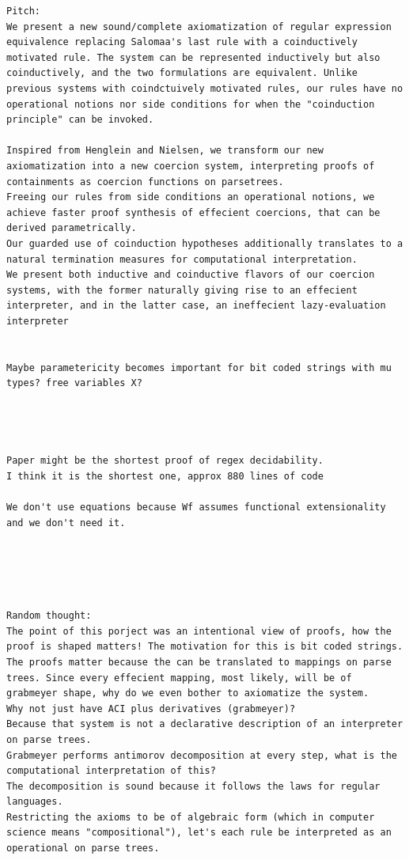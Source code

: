 \begin{verbatim}
Pitch:
We present a new sound/complete axiomatization of regular expression equivalence replacing Salomaa's last rule with a coinductively motivated rule. The system can be represented inductively but also coinductively, and the two formulations are equivalent. Unlike previous systems with coindctuively motivated rules, our rules have no operational notions nor side conditions for when the "coinduction principle" can be invoked.

Inspired from Henglein and Nielsen, we transform our new axiomatization into a new coercion system, interpreting proofs of containments as coercion functions on parsetrees. 
Freeing our rules from side conditions an operational notions, we achieve faster proof synthesis of effecient coercions, that can be derived parametrically.
Our guarded use of coinduction hypotheses additionally translates to a natural termination measures for computational interpretation.
We present both inductive and coinductive flavors of our coercion systems, with the former naturally giving rise to an effecient interpreter, and in the latter case, an ineffecient lazy-evaluation interpreter


Maybe parametericity becomes important for bit coded strings with mu types? free variables X?




Paper might be the shortest proof of regex decidability.
I think it is the shortest one, approx 880 lines of code

We don't use equations because Wf assumes functional extensionality and we don't need it.





Random thought:
The point of this porject was an intentional view of proofs, how the proof is shaped matters! The motivation for this is bit coded strings.
The proofs matter because the can be translated to mappings on parse trees. Since every effecient mapping, most likely, will be of grabmeyer shape, why do we even bother to axiomatize the system.
Why not just have ACI plus derivatives (grabmeyer)? 
Because that system is not a declarative description of an interpreter on parse trees. 
Grabmeyer performs antimorov decomposition at every step, what is the computational interpretation of this?
The decomposition is sound because it follows the laws for regular languages. 
Restricting the axioms to be of algebraic form (which in computer science means "compositional"), let's each rule be interpreted as an operational on parse trees.
\end{verbatim}


